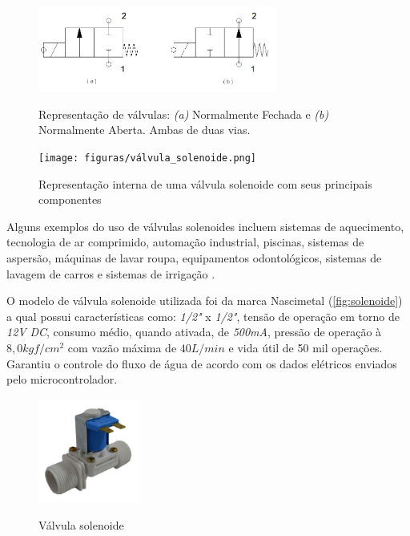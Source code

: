 \begin{figure}[H]
	\centering
	\caption{Representação de válvulas: \textit{(a)} Normalmente Fechada  e \textit{(b)} Normalmente Aberta. Ambas de duas vias.}
	\includegraphics[width=0.7\textwidth]{figuras/valvulas.png}
	\label{fig:valvulas}
\end{figure}

\begin{figure}[H]
	\centering
	\caption{Representação interna de uma válvula solenoide com seus principais componentes}
	\texttt{[image: figuras/válvula\_solenoide.png]}
	\label{fig:valvula_solenoide}
\end{figure}

Alguns exemplos do uso de válvulas solenoides incluem sistemas de aquecimento, tecnologia de ar comprimido, automação industrial, piscinas, sistemas de aspersão, máquinas de lavar roupa, equipamentos odontológicos, sistemas de lavagem de carros e sistemas de irrigação \cite{Citisystems}.

O modelo de válvula solenoide utilizada foi da marca Nascimetal (\autoref{fig:solenoide}) a qual possui características como:  \textit{1/2"} x \textit{1/2"}, tensão de operação em torno de \textit{12V} \textit{DC}, consumo médio, quando ativada, de \textit{500mA}, pressão de operação à $8,0 kgf/cm^2$ com vazão máxima de $40L/min$ e vida útil de 50 mil operações. Garantiu o controle do fluxo de água de acordo com os dados elétricos enviados pelo microcontrolador.

\begin{figure}[H]
	\centering
	\caption{Válvula solenoide}
	\includegraphics[width=0.3\textwidth]{figuras/solenoide.jpg}
	\label{fig:solenoide}
\end{figure}

